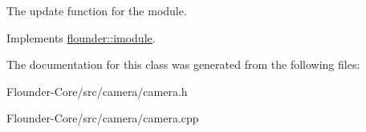 The update function for the module. 



Implements \hyperlink{classflounder_1_1imodule_a9a53d48a46b5f6b16a92b2cd8503f74a}{flounder\+::imodule}.



The documentation for this class was generated from the following files\+:\begin{DoxyCompactItemize}
\item 
Flounder-\/\+Core/src/camera/camera.\+h\item 
Flounder-\/\+Core/src/camera/camera.\+cpp\end{DoxyCompactItemize}
